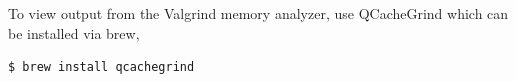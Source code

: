 \documentclass[11pt]{article}
\begin{document}














To view output from the Valgrind memory analyzer, use QCacheGrind which can be installed via brew,
\begin{lstlisting}
$ brew install qcachegrind
\end{lstlisting}
\end{document}
